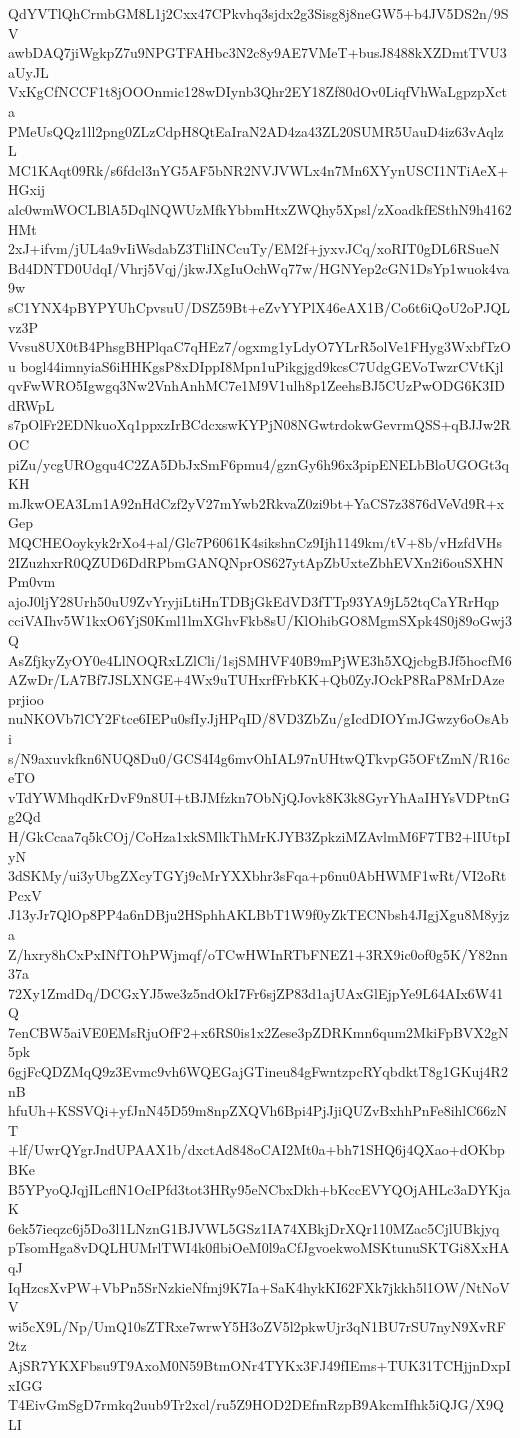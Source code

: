 QdYVTlQhCrmbGM8L1j2Cxx47CPkvhq3sjdx2g3Sisg8j8neGW5+b4JV5DS2n/9SV
awbDAQ7jiWgkpZ7u9NPGTFAHbc3N2c8y9AE7VMeT+busJ8488kXZDmtTVU3aUyJL
VxKgCfNCCF1t8jOOOnmic128wDIynb3Qhr2EY18Zf80dOv0LiqfVhWaLgpzpXcta
PMeUsQQz1ll2png0ZLzCdpH8QtEaIraN2AD4za43ZL20SUMR5UauD4iz63vAqlzL
MC1KAqt09Rk/s6fdcl3nYG5AF5bNR2NVJVWLx4n7Mn6XYynUSCI1NTiAeX+HGxij
alc0wmWOCLBlA5DqlNQWUzMfkYbbmHtxZWQhy5Xpsl/zXoadkfESthN9h4162HMt
2xJ+ifvm/jUL4a9vIiWsdabZ3TliINCcuTy/EM2f+jyxvJCq/xoRIT0gDL6RSueN
Bd4DNTD0UdqI/Vhrj5Vqj/jkwJXgIuOchWq77w/HGNYep2cGN1DsYp1wuok4va9w
sC1YNX4pBYPYUhCpvsuU/DSZ59Bt+eZvYYPlX46eAX1B/Co6t6iQoU2oPJQLvz3P
Vvsu8UX0tB4PhsgBHPlqaC7qHEz7/ogxmg1yLdyO7YLrR5olVe1FHyg3WxbfTzOu
bogl44imnyiaS6iHHKgsP8xDIppI8Mpn1uPikgjgd9kcsC7UdgGEVoTwzrCVtKjl
qvFwWRO5Igwgq3Nw2VnhAnhMC7e1M9V1ulh8p1ZeehsBJ5CUzPwODG6K3IDdRWpL
s7pOlFr2EDNkuoXq1ppxzIrBCdcxswKYPjN08NGwtrdokwGevrmQSS+qBJJw2ROC
piZu/ycgUROgqu4C2ZA5DbJxSmF6pmu4/gznGy6h96x3pipENELbBloUGOGt3qKH
mJkwOEA3Lm1A92nHdCzf2yV27mYwb2RkvaZ0zi9bt+YaCS7z3876dVeVd9R+xGep
MQCHEOoykyk2rXo4+al/Glc7P6061K4sikshnCz9Ijh1149km/tV+8b/vHzfdVHs
2IZuzhxrR0QZUD6DdRPbmGANQNprOS627ytApZbUxteZbhEVXn2i6ouSXHNPm0vm
ajoJ0ljY28Urh50uU9ZvYryjiLtiHnTDBjGkEdVD3fTTp93YA9jL52tqCaYRrHqp
cciVAIhv5W1kxO6YjS0Kml1lmXGhvFkb8sU/KlOhibGO8MgmSXpk4S0j89oGwj3Q
AsZfjkyZyOY0e4LlNOQRxLZlCli/1sjSMHVF40B9mPjWE3h5XQjcbgBJf5hocfM6
AZwDr/LA7Bf7JSLXNGE+4Wx9uTUHxrfFrbKK+Qb0ZyJOckP8RaP8MrDAzeprjioo
nuNKOVb7lCY2Ftce6IEPu0sfIyJjHPqID/8VD3ZbZu/gIcdDIOYmJGwzy6oOsAbi
s/N9axuvkfkn6NUQ8Du0/GCS4I4g6mvOhIAL97nUHtwQTkvpG5OFtZmN/R16ceTO
vTdYWMhqdKrDvF9n8UI+tBJMfzkn7ObNjQJovk8K3k8GyrYhAaIHYsVDPtnGg2Qd
H/GkCcaa7q5kCOj/CoHza1xkSMlkThMrKJYB3ZpkziMZAvlmM6F7TB2+lIUtpIyN
3dSKMy/ui3yUbgZXcyTGYj9cMrYXXbhr3sFqa+p6nu0AbHWMF1wRt/VI2oRtPcxV
J13yJr7QlOp8PP4a6nDBju2HSphhAKLBbT1W9f0yZkTECNbsh4JIgjXgu8M8yjza
Z/hxry8hCxPxINfTOhPWjmqf/oTCwHWInRTbFNEZ1+3RX9ic0of0g5K/Y82nn37a
72Xy1ZmdDq/DCGxYJ5we3z5ndOkI7Fr6sjZP83d1ajUAxGlEjpYe9L64AIx6W41Q
7enCBW5aiVE0EMsRjuOfF2+x6RS0is1x2Zese3pZDRKmn6qum2MkiFpBVX2gN5pk
6gjFcQDZMqQ9z3Evmc9vh6WQEGajGTineu84gFwntzpcRYqbdktT8g1GKuj4R2nB
hfuUh+KSSVQi+yfJnN45D59m8npZXQVh6Bpi4PjJjiQUZvBxhhPnFe8ihlC66zNT
+lf/UwrQYgrJndUPAAX1b/dxctAd848oCAI2Mt0a+bh71SHQ6j4QXao+dOKbpBKe
B5YPyoQJqjILcflN1OcIPfd3tot3HRy95eNCbxDkh+bKccEVYQOjAHLc3aDYKjaK
6ek57ieqzc6j5Do3l1LNznG1BJVWL5GSz1IA74XBkjDrXQr110MZac5CjlUBkjyq
pTsomHga8vDQLHUMrlTWI4k0flbiOeM0l9aCfJgvoekwoMSKtunuSKTGi8XxHAqJ
IqHzcsXvPW+VbPn5SrNzkieNfmj9K7Ia+SaK4hykKI62FXk7jkkh5l1OW/NtNoVV
wi5cX9L/Np/UmQ10sZTRxe7wrwY5H3oZV5l2pkwUjr3qN1BU7rSU7nyN9XvRF2tz
AjSR7YKXFbsu9T9AxoM0N59BtmONr4TYKx3FJ49fIEms+TUK31TCHjjnDxpIxIGG
T4EivGmSgD7rmkq2uub9Tr2xcl/ru5Z9HOD2DEfmRzpB9AkcmIfhk5iQJG/X9QLI
